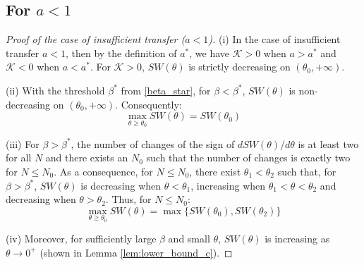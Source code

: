 \documentclass{article}
\begin{document}
\subsection{For $a<1$}
\begin{proof}[Proof of the case of insufficient transfer ($a<1$)]

(i) In the case of insufficient transfer $a<1$, then by the definition of $a^*$, we have $\mathcal{K} > 0$ when $a > a^*$ and $\mathcal{K} < 0$ when $a < a^*$. For $\mathcal{K} > 0$, $SW(\theta)$ is strictly decreasing on $(\theta_0, +\infty)$.

(ii) With the threshold $\beta^*$ from \ref{beta_star}, for $\beta < \beta^*$, $SW(\theta)$ is non-decreasing on $(\theta_0, +\infty)$. Consequently:
        \[
        \max_{\theta \ge \theta_0} SW(\theta)=SW(\theta_0)
        \]

(iii) For $\beta > \beta^*$, the number of changes of the sign of $dSW(\theta)/d\theta$ is at least two for all $N$ and there exists an $N_0$ such that the number of changes is exactly two for $N \le N_0$. As a consequence, for $N \le N_0$, there exist $\theta_1 < \theta_2$ such that, for $\beta > \beta^*$, $SW(\theta)$ is decreasing when $\theta < \theta_1$, increasing when $\theta_1 < \theta < \theta_2$ and decreasing when $\theta > \theta_2$. Thus, for $N \le N_0$:
        \[
        \max_{\theta \ge \theta_0}SW(\theta)=\max\{SW(\theta_0),SW(\theta_2)\}  
        \]

(iv) Moreover, for sufficiently large $\beta$ and small $\theta$, $SW(\theta)$ is increasing as $\theta \to 0^+$ (shown in Lemma \ref{lem:lower_bound_c}).

\end{proof}
\end{document}
